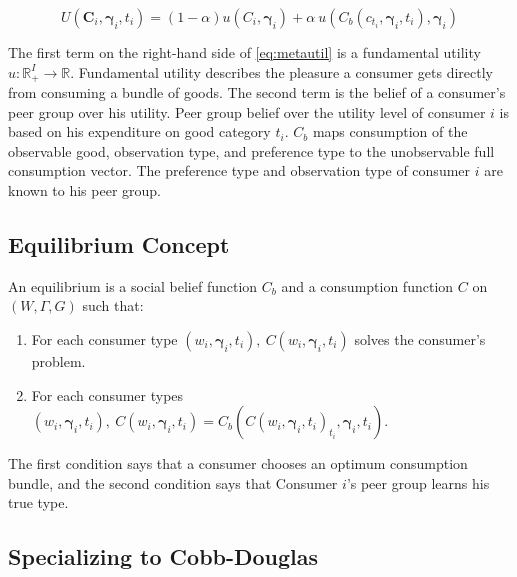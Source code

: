 \documentclass[12pt]{article}
\begin{document}
\begin{equation}
    \label{eq:metautil}
    U(\mathbf{C}_i,\boldsymbol{\gamma}_i,t_i) = (1-\alpha) u(C_i,\boldsymbol{\gamma}_i) + \alpha\  u(C_b(c_{t_i},\boldsymbol{\gamma}_i,t_i),\boldsymbol{\gamma}_i)
\end{equation}

The first term on the right-hand side of \eqref{eq:metautil} is a fundamental utility $u:\mathbb{R}_+^{I}\rightarrow\mathbb{R}$.  
Fundamental utility describes the pleasure a consumer gets directly from consuming a bundle of goods.
The second term is the belief of a consumer's peer group over his utility.  Peer group belief over the utility level of consumer $i$ is based on his expenditure on good category $t_i$.  $C_b$ maps consumption of the observable good, observation type, and preference type to the unobservable full consumption vector.  The preference type and observation type of consumer $i$ are known to his peer group.\footnotemark{}

\subsection{Equilibrium Concept}

An equilibrium is a social belief function $C_b$ and a consumption function $C$ on $(W,\Gamma,G)$ such that:
\begin{enumerate}
    \item For each consumer type $(w_i,\boldsymbol{\gamma}_i,t_i), \ C(w_i,\boldsymbol{\gamma}_i,t_i)$ solves the consumer's problem.
    \item For each consumer types $(w_i,\boldsymbol{\gamma}_i,t_i), \ C(w_i,\boldsymbol{\gamma}_i,t_i) = C_b(C(w_i,\boldsymbol{\gamma}_i,t_i)_{t_i},\boldsymbol{\gamma}_i,t_i).$
\end{enumerate}
The first condition says that a consumer chooses an optimum consumption bundle, and the second condition says that Consumer $i$'s peer group learns his true type.

\subsection{Specializing to Cobb-Douglas}
\end{document}
